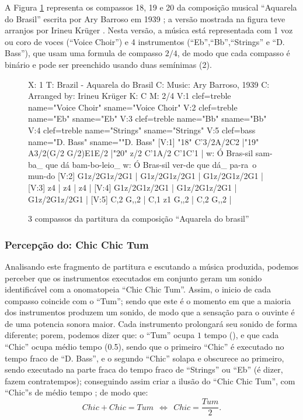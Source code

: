A Figura \ref{fig:abc-caquarela} representa os compassos 18, 19 e 20 da  
composição musical ``Aquarela do Brasil'' escrita
por Ary Barroso em 1939 \cite{AquarelaDoBrasil}; 
a versão mostrada na figura teve arranjos por Irineu Krüger \cite{Irineu}. 
Nesta versão, a música está representada com 1 voz ou coro de voces (``Voice Choir'') e 4 
instrumentos (``Eb'',``Bb'',``Strings'' e ``D. Bass''), que usam uma 
formula de compasso $2/4$, de modo que cada compasso
é binário e
pode ser preenchido usando duas semínimas (2\quarternote).
\begin{figure}[ht]
\centering
\begin{abc}[name=abc-caquarela]
%
X: 1 %
T: Brazil - Aquarela do Brasil
C: Music: Ary Barroso, 1939
C: Arranged by: Irineu Krüger
K: C %
M: 2/4 %
%
V:1 clef=treble name="Voice Choir" sname="Voice Choir"
V:2 clef=treble name="Eb" sname="Eb"
V:3 clef=treble name="Bb" sname="Bb"
V:4 clef=treble name="Strings" sname="Strings"
V:5 clef=bass   name="D. Bass" sname=""D. Bass"
%
%
[V:1] "18" C'3/2A/2C2  |"19" A3/2(G/2 G/2)E1E/2  |"20" z/2 C'1A/2 C'1C'1  |
w:    Ó Bras-sil        sam-ba_ que dá       bam-bo-leio_ 
w:    Ó Bras-sil        ver-de que dá_       pa-ra~o mun-do 
%
%
[V:2] G1z/2G1z/2G1  | G1z/2G1z/2G1  | G1z/2G1z/2G1  |
%
%
[V:3] z4  | z4  | z4  |
%
%
[V:4] G1z/2G1z/2G1  | G1z/2G1z/2G1  | G1z/2G1z/2G1  |
%
%
[V:5] C,2 G,,2  | C,1 z1 G,,2  | C,2 G,,2  |
\end{abc}
\caption{3 compassos da partitura da composição ``Aquarela do brasil''}
\label{fig:abc-caquarela}
\end{figure}

\subsubsection{Percepção do: Chic Chic Tum}
Analisando este fragmento de partitura e escutando a música produzida, 
podemos perceber que os instrumentos executados em conjunto geram um sonido identificável
com a onomatopeia ``Chic Chic Tum''.
Assim, o inicio de cada compasso coincide com o ``Tum''; 
sendo que este é o momento em que a maioria dos instrumentos produzem um sonido, 
de modo que a sensação para o ouvinte é de uma potencia sonora maior. 
Cada instrumento prolongará seu sonido de forma diferente; 
porem,  podemos dizer que: o ``Tum'' ocupa $1$ tempo (\quarternote), 
e que cada ``Chic'' ocupa médio tempo (0.5\quarternote),
sendo que o primeiro ``Chic'' é executado no tempo fraco de ``D. Bass'', 
e o segundo ``Chic'' solapa e obscurece ao  primeiro, 
sendo executado na parte fraca do tempo fraco de ``Strings'' ou ``Eb'' (é dizer, fazem contratempos);
conseguindo assim criar a ilusão do ``Chic Chic Tum'', com ``Chic''s de médio tempo ; de modo que:
\begin{equation}
Chic + Chic = Tum ~~ \Longleftrightarrow ~~ Chic = \frac{Tum}{2}.
\end{equation}
 
